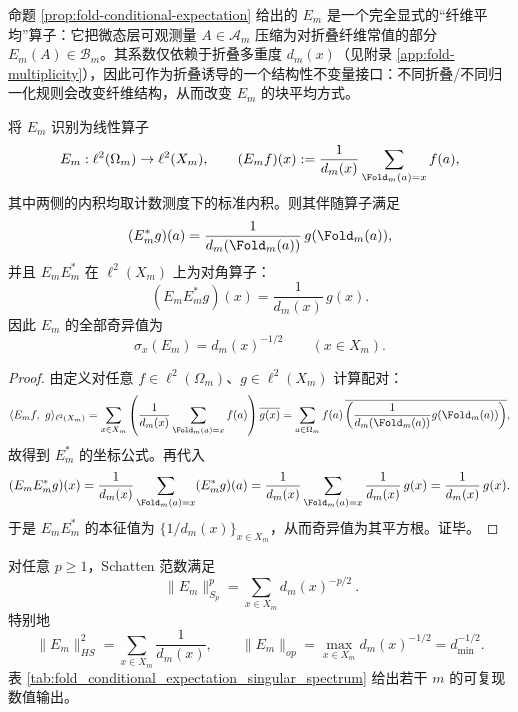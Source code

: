 \begin{remark}
\label{rem:fold-expectation-interface}
命题 \ref{prop:fold-conditional-expectation} 给出的 $E_m$ 是一个完全显式的“纤维平均”算子：它把微态层可观测量 $A\in\mathcal{A}_m$ 压缩为对折叠纤维常值的部分 $E_m(A)\in\mathcal{B}_m$。其系数仅依赖于折叠多重度 $d_m(x)$（见附录 \ref{app:fold-multiplicity}），因此可作为折叠诱导的一个结构性不变量接口：不同折叠/不同归一化规则会改变纤维结构，从而改变 $E_m$ 的块平均方式。
\end{remark}

\begin{proposition}\label{prop:fold-conditional-expectation-singular-spectrum}
将 $E_m$ 识别为线性算子
\[
E_m:\ell^2(\Omega_m)\to \ell^2(X_m),
\qquad
(E_m f)(x):=\frac{1}{d_m(x)}\sum_{\Fold_m(a)=x} f(a),
\]
其中两侧的内积均取计数测度下的标准内积。则其伴随算子满足
\[
(E_m^\ast g)(a)=\frac{1}{d_m(\Fold_m(a))}\,g(\Fold_m(a)),
\]
并且 \(E_mE_m^\ast\) 在 \(\ell^2(X_m)\) 上为对角算子：
\[
(E_mE_m^\ast g)(x)=\frac{1}{d_m(x)}\,g(x).
\]
因此 \(E_m\) 的全部奇异值为
\[
\boxed{\ \sigma_x(E_m)=d_m(x)^{-1/2}\qquad(x\in X_m).\ }
\]
\end{proposition}
\begin{proof}
由定义对任意 \(f\in\ell^2(\Omega_m)\)、\(g\in\ell^2(X_m)\) 计算配对：
\[
\langle E_m f,\ g\rangle_{\ell^2(X_m)}
=\sum_{x\in X_m}\left(\frac{1}{d_m(x)}\sum_{\Fold_m(a)=x} f(a)\right)\overline{g(x)}
=\sum_{a\in\Omega_m} f(a)\,\overline{\left(\frac{1}{d_m(\Fold_m(a))}g(\Fold_m(a))\right)},
\]
故得到 \(E_m^\ast\) 的坐标公式。再代入
\[
(E_mE_m^\ast g)(x)
=\frac{1}{d_m(x)}\sum_{\Fold_m(a)=x}(E_m^\ast g)(a)
=\frac{1}{d_m(x)}\sum_{\Fold_m(a)=x}\frac{1}{d_m(x)}\,g(x)
=\frac{1}{d_m(x)}\,g(x).
\]
于是 \(E_mE_m^\ast\) 的本征值为 \(\{1/d_m(x)\}_{x\in X_m}\)，从而奇异值为其平方根。证毕。
\end{proof}

\begin{corollary}\label{cor:fold-conditional-expectation-schatten}
对任意 \(p\ge 1\)，Schatten 范数满足
\[
\boxed{\ \|E_m\|_{S_p}^p=\sum_{x\in X_m} d_m(x)^{-p/2}\ }.
\]
特别地
\[
\|E_m\|_{HS}^2=\sum_{x\in X_m}\frac{1}{d_m(x)},
\qquad
\|E_m\|_{op}=\max_{x\in X_m} d_m(x)^{-1/2}=d_{\min}^{-1/2}.
\]
表 \ref{tab:fold_conditional_expectation_singular_spectrum} 给出若干 \(m\) 的可复现数值输出。
\end{corollary}


